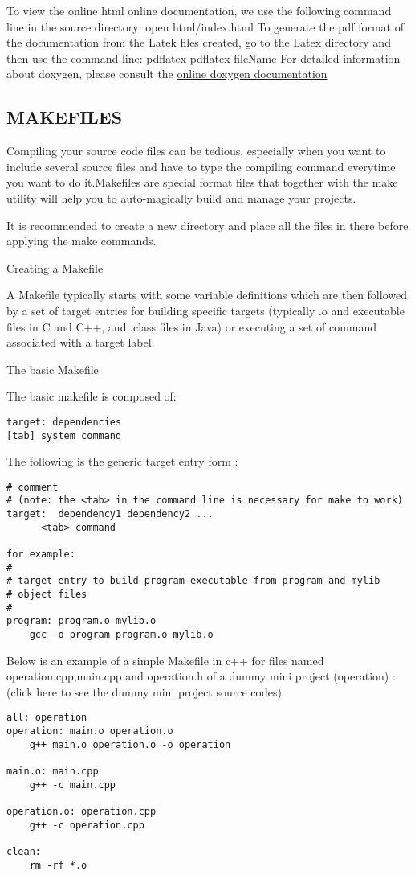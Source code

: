 \documentclass[11pt,utf8]{article}
\begin{document}
To view the online html online documentation, we use the following command line in the source directory:
open html/index.html
To generate the pdf format of the documentation from the Latek files created, go to the Latex directory and then use the command line:
 pdflatex   
 pdflatex fileName
For detailed information about doxygen, please consult the \href{http://www.stack.nl/~dimitri/doxygen/manual/index.html}{online doxygen documentation}
\subsection{MAKEFILES}

Compiling your source code files can be tedious, especially when you want to include several source files and have to type the compiling command everytime you want to do it.Makefiles are special format files that together with the make utility will help you to auto-magically build and manage your projects.

It is recommended to create a new directory and place all the files in there before applying the make commands.

Creating a Makefile

A Makefile typically starts with some variable definitions which are then followed by a set of target entries for building specific targets (typically .o and executable files in C and C++, and .class files in Java) or executing a set of command associated with a target label.

The basic Makefile

The basic makefile is composed of:
\begin{lstlisting}
target: dependencies
[tab] system command
\end{lstlisting}
The following is the generic target entry form :
\begin{lstlisting}
# comment
# (note: the <tab> in the command line is necessary for make to work) 
target:  dependency1 dependency2 ...
      <tab> command

for example:
#
# target entry to build program executable from program and mylib 
# object files 
#
program: program.o mylib.o
    gcc -o program program.o mylib.o
\end{lstlisting}
Below is an example of a simple Makefile in c++ for files named operation.cpp,main.cpp and operation.h of a dummy mini project (operation) :(click here to see the dummy mini project source codes)
\begin{lstlisting}
all: operation 
operation: main.o operation.o
    g++ main.o operation.o -o operation 

main.o: main.cpp
    g++ -c main.cpp

operation.o: operation.cpp
    g++ -c operation.cpp

clean:
    rm -rf *.o
\end{lstlisting}
\end{document}
